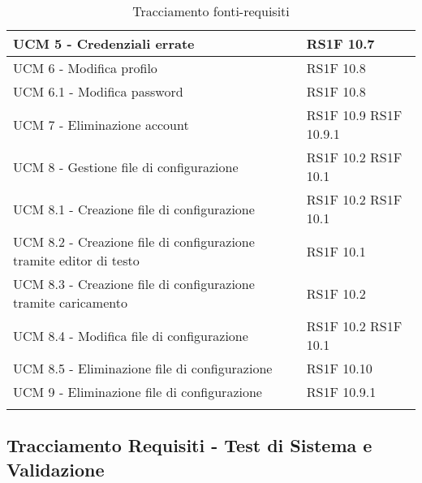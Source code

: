 \begin{center}
\begin{longtable}{ | p{5cm} | p{5cm} |}
            UCM 5 - Credenziali errate &  RS1F 10.7 \newline  \\ \hline      
            UCM 6 - Modifica profilo &  RS1F 10.8 \newline  \\ \hline      
            UCM 6.1 - Modifica password &  RS1F 10.8 \newline  \\ \hline      
            UCM 7 - Eliminazione account &  RS1F 10.9 \newline  RS1F 10.9.1 \newline  \\ \hline      
            UCM 8 - Gestione file di configurazione &  RS1F 10.2 \newline  RS1F 10.1 \newline  \\ \hline      
            UCM 8.1 - Creazione file di configurazione &  RS1F 10.2 \newline  RS1F 10.1 \newline  \\ \hline      
            UCM 8.2 - Creazione file di configurazione tramite editor di testo &  RS1F 10.1 \newline  \\ \hline      
            UCM 8.3 - Creazione file di configurazione tramite caricamento &  RS1F 10.2 \newline  \\ \hline      
            UCM 8.4 - Modifica file di configurazione &  RS1F 10.2 \newline  RS1F 10.1 \newline  \\ \hline      
            UCM 8.5 - Eliminazione file di configurazione &  RS1F 10.10 \newline  \\ \hline      
            UCM 9 - Eliminazione file di configurazione &  RS1F 10.9.1 \newline  \\ \hline  
      \caption{Tracciamento fonti-requisiti}   
      \end{longtable}
      \egroup
      \end{center}  
\clearpage
\subsection{Tracciamento Requisiti - Test di Sistema e Validazione}

